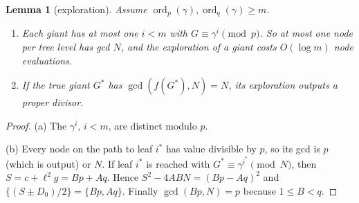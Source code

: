 \documentclass[11pt]{amsart}
\newtheorem{lemma}[theorem]{Lemma}
\theoremstyle{definition}
\newcommand{\ord}{\operatorname{ord}}
\begin{document}
\begin{lemma}[exploration]\label{lem:X}
Assume $\ord_p(\gamma),\ord_q(\gamma)\ge m$.
\begin{enumerate}[label=(\alph*)]
\item Each giant has at most one $i<m$ with $G\equiv\gamma^i\pmod p$. So at most one node per
  tree level has gcd $N$, and the exploration of a giant costs $O(\log m)$ node evaluations.
\item If the true giant $G^*$ has $\gcd(f(G^*),N)=N$, its exploration outputs a proper divisor.
\end{enumerate}
\end{lemma}
\begin{proof}
(a) The $\gamma^i$, $i<m$, are distinct modulo $p$.

(b) Every node on the path to leaf $i^*$ has value divisible by $p$, so its gcd is $p$ (which is
output) or $N$. If leaf $i^*$ is reached with $G^*\equiv\gamma^{i^*}\pmod N$, then
$S=c+\ell^2g=Bp+Aq$. Hence $S^2-4ABN=(Bp-Aq)^2$ and $\{(S\pm D_0)/2\}=\{Bp,Aq\}$. Finally
$\gcd(Bp,N)=p$ because $1\le B<q$.
\end{proof}
\end{document}

